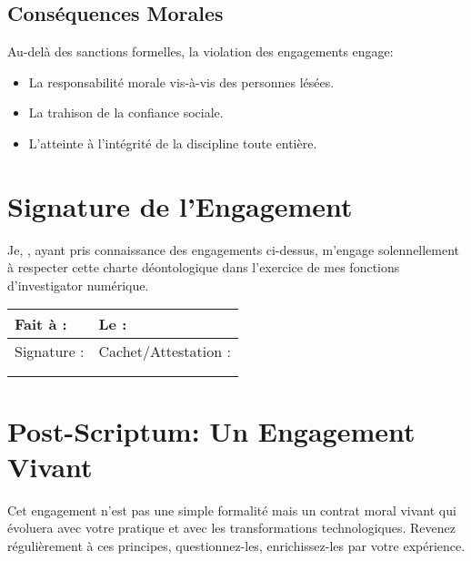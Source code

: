 \documentclass[11pt,a4paper,oneside]{book}
\begin{document}
            \subsection*{Conséquences Morales}
                Au-delà des sanctions formelles, la violation des engagements engage:
                \begin{itemize}
                    \item La responsabilité morale vis-à-vis des personnes lésées.
                    \item La trahison de la confiance sociale.
                    \item L'atteinte à l'intégrité de la discipline toute entière.
                \end{itemize}

        \section*{Signature de l'Engagement}
        Je, \underline{\hspace{8cm}}, ayant pris connaissance des engagements ci-dessus, m'engage solennellement à respecter cette charte déontologique dans l'exercice de mes fonctions d'investigator numérique.

        \vspace{1cm}

        \begin{tabular}{p{8cm}p{8cm}}
        \hline
        Fait à : \underline{\hspace{5cm}} & Le : \underline{\hspace{5cm}} \\
        \hline
        Signature : & Cachet/Attestation : \\
        & \\
        & \\
        \hline
        \end{tabular}

        \section*{Post-Scriptum: Un Engagement Vivant}
        Cet engagement n'est pas une simple formalité mais un contrat moral vivant qui évoluera avec votre pratique et avec les transformations technologiques. Revenez régulièrement à ces principes, questionnez-les, enrichissez-les par votre expérience.

        \medskip
\end{document}
